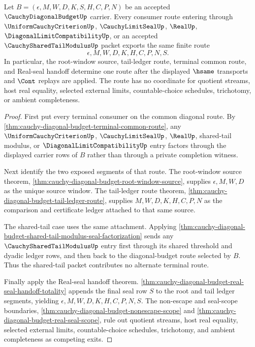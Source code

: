 \begin{theorem}
\label{thm:cauchy-diagonal-budget-terminal-route-coincidence}
Let $B=(\epsilon,M,W,D,K,S,H,C,P,N)$ be an accepted $\CauchyDiagonalBudgetUp$ carrier. Every consumer route entering through $\UniformCauchyCriterionUp$, $\CauchyLimitSealUp$, $\RealUp$, $\DiagonalLimitCompatibilityUp$, or an accepted $\CauchySharedTailModulusUp$ packet exports the same finite route
$$
\epsilon,M,W,D,K,H,C,P,N,S.
$$
In particular, the root-window source, tail-ledger route, terminal common route, and Real-seal handoff determine one route after the displayed $\hsame$ transports and $\Cont$ replays are applied. The route has no coordinate for quotient streams, host real equality, selected external limits, countable-choice schedules, trichotomy, or ambient completeness.
\end{theorem}
\begin{proof}
First put every terminal consumer on the common diagonal route. By \autoref{thm:cauchy-diagonal-budget-terminal-common-route}, any $\UniformCauchyCriterionUp$, $\CauchyLimitSealUp$, $\RealUp$, shared-tail modulus, or $\DiagonalLimitCompatibilityUp$ entry factors through the displayed carrier rows of $B$ rather than through a private completion witness.

Next identify the two exposed segments of that route. The root-window source theorem, \autoref{thm:cauchy-diagonal-budget-root-window-source}, supplies $\epsilon,M,W,D$ as the unique source window. The tail-ledger route theorem, \autoref{thm:cauchy-diagonal-budget-tail-ledger-route}, supplies $M,W,D,K,H,C,P,N$ as the comparison and certificate ledger attached to that same source.

The shared-tail case uses the same attachment. Applying \autoref{thm:cauchy-diagonal-budget-shared-tail-modulus-seal-factorization} sends any $\CauchySharedTailModulusUp$ entry first through its shared threshold and dyadic ledger rows, and then back to the diagonal-budget route selected by $B$. Thus the shared-tail packet contributes no alternate terminal route.

Finally apply the Real-seal handoff theorem. \autoref{thm:cauchy-diagonal-budget-real-seal-handoff-totality} appends the final seal row $S$ to the root and tail ledger segments, yielding $\epsilon,M,W,D,K,H,C,P,N,S$. The non-escape and seal-scope boundaries, \autoref{thm:cauchy-diagonal-budget-nonescape-scope} and \autoref{thm:cauchy-diagonal-budget-real-seal-scope}, rule out quotient streams, host real equality, selected external limits, countable-choice schedules, trichotomy, and ambient completeness as competing exits.
\end{proof}

